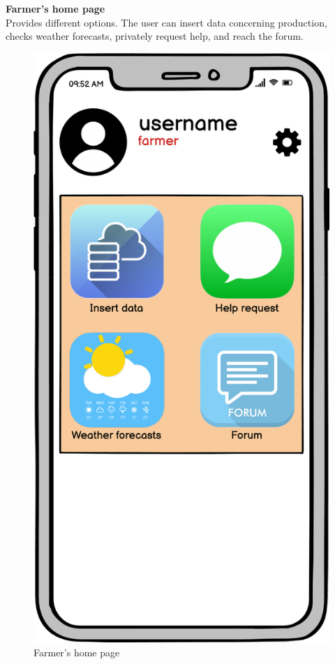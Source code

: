 \textbf{Farmer's home page} \\
Provides different options. The user can insert data concerning production,
checks weather forecasts, privately request help, and reach the forum.
\begin{figure}[H]
    \centering
    \includegraphics[scale=0.45]{Images/farmerHomePage.png}
    \caption{Farmer's home page}
\end{figure}

